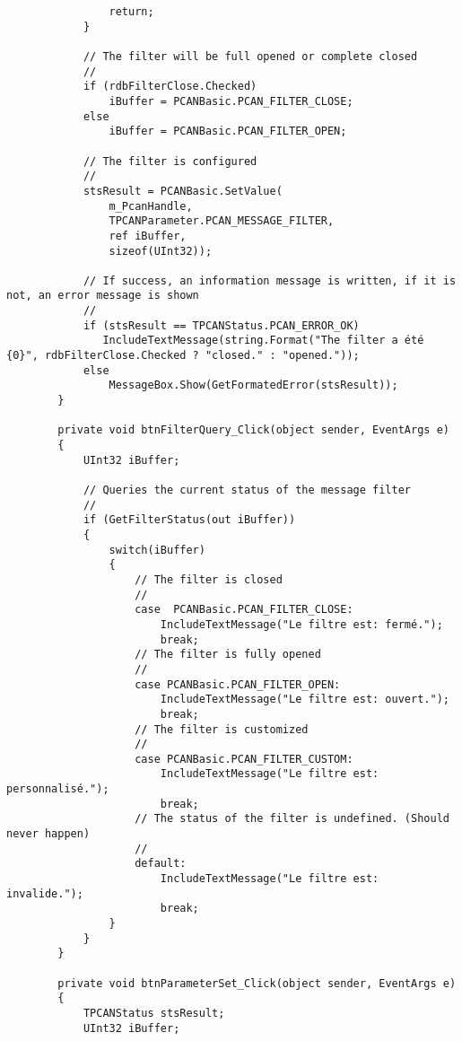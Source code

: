 \begin{lstlisting}
                return;
            }

            // The filter will be full opened or complete closed
            //
            if (rdbFilterClose.Checked)
                iBuffer = PCANBasic.PCAN_FILTER_CLOSE;
            else
                iBuffer = PCANBasic.PCAN_FILTER_OPEN;

            // The filter is configured
            //
            stsResult = PCANBasic.SetValue(
                m_PcanHandle,
                TPCANParameter.PCAN_MESSAGE_FILTER,
                ref iBuffer,
                sizeof(UInt32));

            // If success, an information message is written, if it is not, an error message is shown
            //
            if (stsResult == TPCANStatus.PCAN_ERROR_OK)
               IncludeTextMessage(string.Format("The filter a été {0}", rdbFilterClose.Checked ? "closed." : "opened."));
            else
                MessageBox.Show(GetFormatedError(stsResult));
        }

        private void btnFilterQuery_Click(object sender, EventArgs e)
        {
            UInt32 iBuffer;

            // Queries the current status of the message filter
            //
            if (GetFilterStatus(out iBuffer))
            {
                switch(iBuffer)
                {
                    // The filter is closed
                    //
                    case  PCANBasic.PCAN_FILTER_CLOSE:
                        IncludeTextMessage("Le filtre est: fermé.");
                        break;
                    // The filter is fully opened
                    //
                    case PCANBasic.PCAN_FILTER_OPEN:
                        IncludeTextMessage("Le filtre est: ouvert.");
                        break;
                    // The filter is customized
                    //
                    case PCANBasic.PCAN_FILTER_CUSTOM:
                        IncludeTextMessage("Le filtre est: personnalisé.");
                        break;
                    // The status of the filter is undefined. (Should never happen)
                    //
                    default:
                        IncludeTextMessage("Le filtre est: invalide.");
                        break;
                }
            }
        }

        private void btnParameterSet_Click(object sender, EventArgs e)
        {
            TPCANStatus stsResult;
            UInt32 iBuffer;


\end{lstlisting}
